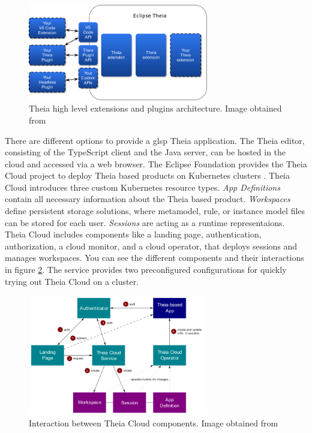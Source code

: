 \documentclass[conference,onecolumn]{IEEEtran}
\begin{document}
  \begin{figure}[h]
    \centering
    \includegraphics[width=0.7\textwidth]{theia-extension}
    \caption{Theia high level extensions and plugins architecture. Image obtained from \cite{theia-doc}}
    \label{fig:theia-extensions}
  \end{figure}

  There are different options to provide a \ac{glsp} Theia application. The Theia editor, consisting of the TypeScript client and the Java server, can be hosted in the cloud and accessed via a web browser. The Eclipse Foundation provides the Theia Cloud project \cite{theia-cloud-doc} to deploy Theia based products on Kubernetes clusters \cite{kubernetes}. Theia Cloud introduces three custom Kubernetes resource types. \textit{App Definitions} contain all necessary information about the Theia based product. \textit{Workspaces} define persistent storage solutions, where metamodel, rule, or instance model files can be stored for each user. \textit{Sessions} are acting as a runtime representaions. Theia Cloud includes components like a landing page, authentication, authorization, a cloud monitor, and a cloud operator, that deploys sessions and manages workspaces. You can see the different components and their interactions in figure \ref{fig:theia-cloud-components}. The service provides two preconfigured configurations for quickly trying out Theia Cloud on a cluster. \cite{theia-cloud-doc}

  \begin{figure}[h]
    \centering
    \includegraphics[width=0.7\textwidth]{theia-cloud-components.png}
    \caption{Interaction between Theia Cloud components. Image obtained from \cite{theia-cloud-doc}}
    \label{fig:theia-cloud-components}
  \end{figure}
\end{document}
